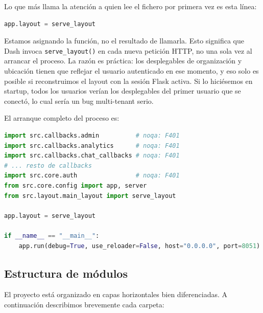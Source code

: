 \documentclass[12pt, a4paper]{article}
\begin{document}
Lo que más llama la atención a quien lee el fichero por primera vez es esta línea:

\begin{lstlisting}[language=Python]
app.layout = serve_layout
\end{lstlisting}

Estamos asignando la función, no el resultado de llamarla. Esto significa que Dash invoca \texttt{serve\_layout()} en cada nueva petición HTTP, no una sola vez al arrancar el proceso. La razón es práctica: los desplegables de organización y ubicación tienen que reflejar el usuario autenticado en ese momento, y eso solo es posible si reconstruimos el layout con la sesión Flask activa. Si lo hiciésemos en startup, todos los usuarios verían los desplegables del primer usuario que se conectó, lo cual sería un bug multi-tenant serio.

El arranque completo del proceso es:

\begin{lstlisting}[language=Python]
import src.callbacks.admin          # noqa: F401
import src.callbacks.analytics      # noqa: F401
import src.callbacks.chat_callbacks # noqa: F401
# ... resto de callbacks
import src.core.auth                # noqa: F401
from src.core.config import app, server
from src.layout.main_layout import serve_layout

app.layout = serve_layout

if __name__ == "__main__":
    app.run(debug=True, use_reloader=False, host="0.0.0.0", port=8051)
\end{lstlisting}

\subsection{Estructura de módulos}

El proyecto está organizado en capas horizontales bien diferenciadas. A continuación describimos brevemente cada carpeta:
\end{document}
